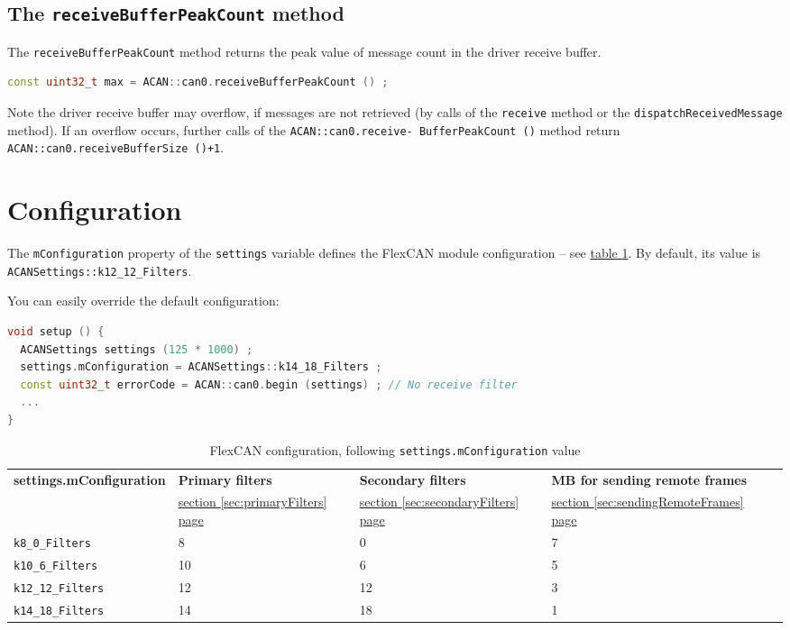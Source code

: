 \documentclass[10pt, a4paper, obeyspaces, openany]{extarticle}
\newcommand \sectionLabel[2]{\section{#1}\label{sec:#2}}
\newcommand\refSectionPage[1]{\hyperref[sec:#1]{section \ref*{sec:#1} page \pageref{sec:#1}}}
\newcommand\labelTableau[1]{\label{tab:#1}}
\newcommand\refTableau[1]{\hyperref[tab:#1]{table \ref*{tab:#1}}}
\begin{document}
\subsection{The \texttt{receiveBufferPeakCount} method}

The \texttt{receiveBufferPeakCount} method returns the peak value of message count in the driver receive buffer.
{ \small\begin{lstlisting}[language=c++]
const uint32_t max = ACAN::can0.receiveBufferPeakCount () ;
\end{lstlisting}}

Note the driver receive buffer may overflow, if messages are not retrieved (by calls of the \texttt{receive} method or the \texttt{dispatchReceivedMessage} method). If an overflow occurs, further calls of the \texttt{ACAN::can0.receive- BufferPeakCount ()} method return \texttt{ACAN::can0.receiveBufferSize ()+1}.








\sectionLabel{Configuration}{FlexCANconfiguration}

The \texttt{mConfiguration} property of the \texttt{settings} variable defines the FlexCAN module configuration -- see \refTableau {configFlexCAN}. By default, its value is \texttt{ACANSettings::k12\_12\_Filters}.

You can easily override the default configuration:
{ \small\begin{lstlisting}[language=c++]
void setup () {
  ACANSettings settings (125 * 1000) ;
  settings.mConfiguration = ACANSettings::k14_18_Filters ;
  const uint32_t errorCode = ACAN::can0.begin (settings) ; // No receive filter
  ...
}
\end{lstlisting}}


\begin{table}[!ht]
  \small
  \onehalfspacing
  \centering
  \begin{tabular}{lllll}
    \textbf{settings.mConfiguration}& \textbf{Primary filters} & \textbf{Secondary filters} & \textbf{MB for sending remote frames} \\
                                   & \refSectionPage{primaryFilters} & \refSectionPage{secondaryFilters} & \refSectionPage{sendingRemoteFrames} \\
    \texttt{k8\_0\_Filters} & 8 & 0 & 7\\
    \texttt{k10\_6\_Filters} & 10 & 6 & 5\\
    \texttt{k12\_12\_Filters} & 12 & 12 & 3\\
    \texttt{k14\_18\_Filters} & 14 & 18 & 1\\
  \end{tabular}
  \caption{FlexCAN configuration, following \texttt{settings.mConfiguration} value}
  \labelTableau{configFlexCAN}
\end{table}
\end{document}
